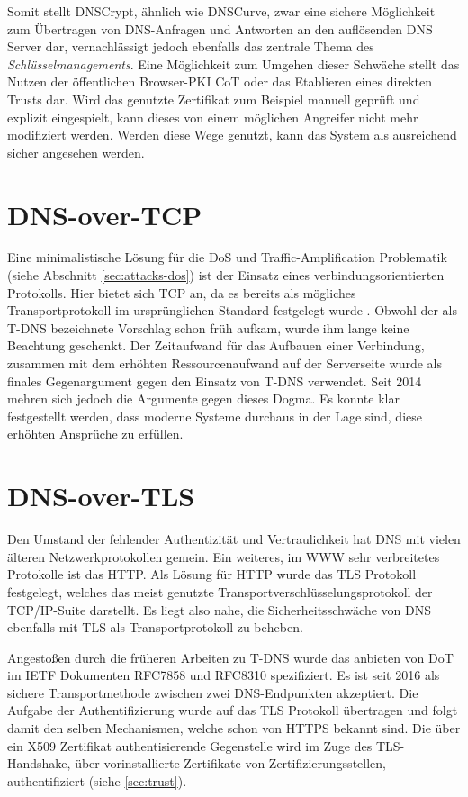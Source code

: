Somit stellt DNSCrypt, ähnlich wie DNSCurve, zwar eine sichere  Möglichkeit zum Übertragen von DNS-Anfragen und Antworten an den auflösenden DNS Server dar, vernachlässigt jedoch ebenfalls das zentrale Thema des \textit{Schlüsselmanagements}. Eine Möglichkeit zum Umgehen dieser Schwäche stellt das Nutzen der öffentlichen Browser-PKI CoT oder das Etablieren eines direkten Trusts dar. Wird das genutzte Zertifikat zum Beispiel manuell geprüft und explizit eingespielt, kann dieses von einem möglichen Angreifer nicht mehr modifiziert werden. Werden diese Wege genutzt, kann das System als ausreichend sicher angesehen werden.

\section{DNS-over-TCP}
Eine minimalistische Lösung für die DoS und Traffic-Amplification Problematik (siehe Abschnitt \ref{sec:attacks-dos}) ist der Einsatz eines verbindungsorientierten Protokolls. Hier bietet sich TCP an, da es bereits als mögliches Transportprotokoll im ursprünglichen Standard festgelegt wurde \cite{rfc1035}. Obwohl der als \ac{T-DNS} bezeichnete Vorschlag schon früh aufkam, wurde ihm lange keine Beachtung geschenkt. Der Zeitaufwand für das Aufbauen einer Verbindung, zusammen mit dem erhöhten Ressourcenaufwand auf der Serverseite wurde als finales Gegenargument gegen den Einsatz von \ac{T-DNS} verwendet. Seit 2014 mehren sich jedoch die Argumente gegen dieses Dogma. Es konnte klar festgestellt werden, dass moderne Systeme durchaus in der Lage sind, diese erhöhten Ansprüche zu erfüllen\cite{Zhu2015}. 

\section{DNS-over-TLS}
\label{sec:tec-dot}
Den Umstand der fehlender Authentizität und Vertraulichkeit hat DNS mit vielen älteren Netzwerkprotokollen gemein. Ein weiteres,  im \ac{WWW} sehr verbreitetes Protokolle ist das \ac{HTTP}. Als Lösung für HTTP wurde das \ac{TLS} Protokoll festgelegt, welches das meist genutzte Transportverschlüsselungsprotokoll der TCP/IP-Suite darstellt. Es liegt also nahe, die Sicherheitsschwäche von DNS ebenfalls mit TLS als Transportprotokoll zu beheben.

Angestoßen durch die früheren Arbeiten zu \ac{T-DNS} wurde das anbieten von \ac{DoT} im IETF Dokumenten RFC7858\cite{rfc7858} und RFC8310\cite{Dickinson2018} spezifiziert. Es ist seit 2016 als sichere Transportmethode zwischen zwei DNS-Endpunkten akzeptiert. Die Aufgabe der Authentifizierung wurde auf das TLS Protokoll übertragen und folgt damit den selben Mechanismen, welche schon von HTTPS bekannt sind. Die über ein X509 Zertifikat authentisierende Gegenstelle wird im Zuge des TLS-Handshake, über vorinstallierte Zertifikate von Zertifizierungsstellen, authentifiziert (siehe \ref{sec:trust}).

